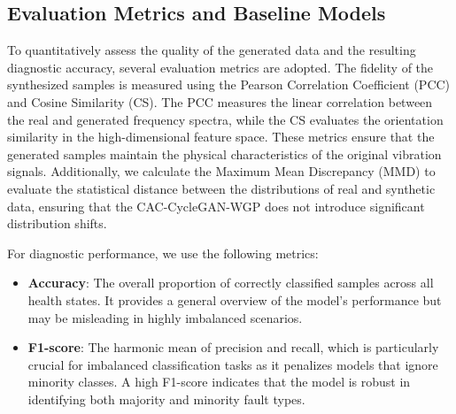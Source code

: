 \documentclass[twocolumn]{IEEEtran}
\begin{document}
\subsection{Evaluation Metrics and Baseline Models}
To quantitatively assess the quality of the generated data and the resulting diagnostic accuracy, several evaluation metrics are adopted. 
The fidelity of the synthesized samples is measured using the Pearson Correlation Coefficient (PCC) and Cosine Similarity (CS). The PCC measures the linear correlation between the real and generated frequency spectra, while the CS evaluates the orientation similarity in the high-dimensional feature space. These metrics ensure that the generated samples maintain the physical characteristics of the original vibration signals. Additionally, we calculate the Maximum Mean Discrepancy (MMD) to evaluate the statistical distance between the distributions of real and synthetic data, ensuring that the CAC-CycleGAN-WGP does not introduce significant distribution shifts.

For diagnostic performance, we use the following metrics:
\begin{itemize}
    \item \textbf{Accuracy}: The overall proportion of correctly classified samples across all health states. It provides a general overview of the model's performance but may be misleading in highly imbalanced scenarios.
    \item \textbf{F1-score}: The harmonic mean of precision and recall, which is particularly crucial for imbalanced classification tasks as it penalizes models that ignore minority classes. A high F1-score indicates that the model is robust in identifying both majority and minority fault types.
\end{itemize}
\end{document}
